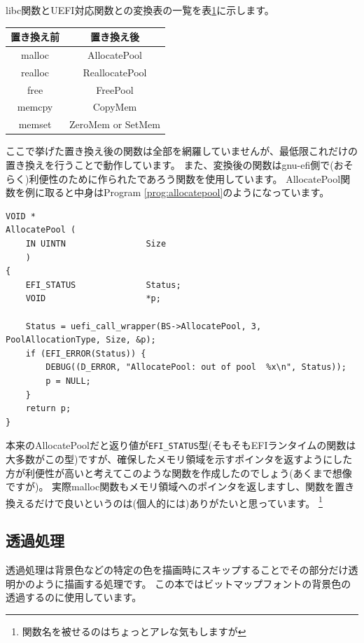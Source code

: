 \documentclass[10pt,b5paper,twoside,openany]{ltjsbook}
\begin{document}
libc関数とUEFI対応関数との変換表の一覧を表\ref{tb:function}に示します。
\begin{table}[H]
    \centering
    \begin{tabular}{|c|c|}
        \hline
        置き換え前 & 置き換え後 \\
        \hline
        malloc & AllocatePool \\
        realloc & ReallocatePool \\
        free & FreePool \\
        memcpy & CopyMem \\
        memset & ZeroMem or SetMem \\
        \hline
    \end{tabular}
    \label{tb:function}
\end{table}
ここで挙げた置き換え後の関数は全部を網羅していませんが、最低限これだけの置き換えを行うことで動作しています。
また、変換後の関数はgnu-efi側で(おそらく)利便性のために作られたであろう関数を使用しています。
AllocatePool関数を例に取ると中身はProgram \ref{prog:allocatepool}のようになっています。
\begin{lstlisting}[style=customC,caption=AllocatePool function,label=prog:allocatepool]
VOID *
AllocatePool (
    IN UINTN                Size
    )
{
    EFI_STATUS              Status;
    VOID                    *p;

    Status = uefi_call_wrapper(BS->AllocatePool, 3, PoolAllocationType, Size, &p);
    if (EFI_ERROR(Status)) {
        DEBUG((D_ERROR, "AllocatePool: out of pool  %x\n", Status));
        p = NULL;
    }
    return p;
}
\end{lstlisting}
本来のAllocatePoolだと返り値が\verb+EFI_STATUS+型(そもそもEFIランタイムの関数は大多数がこの型)ですが、確保したメモリ領域を示すポインタを返すようにした方が利便性が高いと考えてこのような関数を作成したのでしょう(あくまで想像ですが)。
実際malloc関数もメモリ領域へのポインタを返しますし、関数を置き換えるだけで良いというのは(個人的には)ありがたいと思っています。
\footnote{関数名を被せるのはちょっとアレな気もしますが}

\subsection{透過処理}
透過処理は背景色などの特定の色を描画時にスキップすることでその部分だけ透明かのように描画する処理です。
この本ではビットマップフォントの背景色の透過するのに使用しています。
\end{document}
